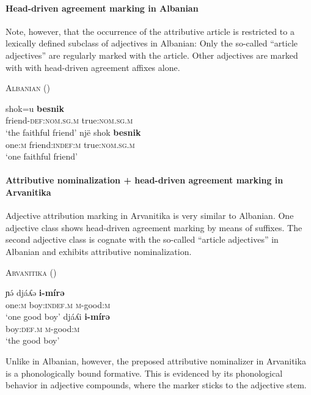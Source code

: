 \paragraph{Head-driven agreement marking in Albanian}
Note, however, that the occurrence of the attributive article is restricted to a lexically defined subclass of adjectives in Albanian: Only the so-called “article adjectives” are regularly marked with the article. Other adjectives are marked with with head-driven agreement affixes alone.
\begin{exe}
\ex \textsc{Albanian} (\citealt[167]{himmelmann1997})
\begin{xlist}
\ex
\gll	shok=u					\textbf{besnik}\\
	friend-\textsc{def:nom.sg.m} 	true:\textsc{nom.sg.m}\\
\glt	‘the faithful friend’
\ex
\gll 	nj\"e			shok					\textbf{besnik}\\
	one:\textsc{m}	friend:\textsc{indef:m} 	true:\textsc{nom.sg.m}\\
\glt	‘one faithful friend’
\end{xlist}
\end{exe}

\paragraph{Attributive nominalization + head-driven agreement marking in Arvanitika}
Adjective attribution marking in Arvanitika is very similar to Albanian. One adjective class shows head-driven agreement marking by means of suffixes. The second adjective class is cognate with the so-called “article adjectives” in Albanian and exhibits attributive nominalization. 
\newpage
\begin{exe}
\ex \textsc{Arvanitika} (\citealt[303]{sasse1991})
\begin{xlist}
\ex
\gll	ɲə́ 			djáʎə 			\textbf{i-mírə}\\
	one:\textsc{m} 	boy:\textsc{indef.m} 	\textsc{m}-good:\textsc{m}\\
\glt	‘one good boy’
\ex
\gll				djáʎi 				\textbf{i-mírə}\\
				boy:\textsc{def.m} 	\textsc{m}-good:\textsc{m}\\
\glt	‘the good boy’
\end{xlist}
\end{exe}
Unlike in Albanian, however, the preposed attributive nominalizer in Arvanitika is a phonologically bound formative. This is evidenced by its phonological behavior in adjective compounds, where the marker sticks to the adjective stem.

